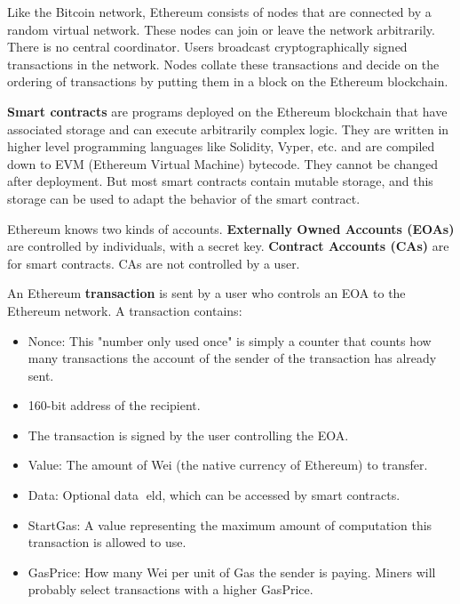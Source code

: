Like the Bitcoin network, Ethereum consists of nodes that are connected by a random virtual network. These nodes can join or leave the network arbitrarily. There is no central coordinator. Users broadcast cryptographically signed transactions in the network. Nodes collate these transactions and decide on the ordering of transactions by putting them in a block on the Ethereum blockchain. \medskip

\textbf{Smart contracts} are programs deployed on the Ethereum blockchain that have associated storage and can execute arbitrarily complex logic. They are written in higher level programming languages like Solidity, Vyper, etc. and are compiled down to EVM (Ethereum Virtual Machine) bytecode. They cannot be changed after deployment. But most smart contracts contain mutable storage, and this storage can be used to adapt the behavior of the smart contract. \medskip

Ethereum knows two kinds of accounts. \textbf{Externally Owned Accounts (EOAs)} are controlled by individuals, with a secret key. \textbf{Contract Accounts (CAs)} are for smart contracts. CAs are not controlled by a user. \medskip

An Ethereum \textbf{transaction} is sent by a user who controls an EOA to the Ethereum network. A transaction contains:
\begin{itemize}
	\item Nonce: This "number only used once" is simply a counter that counts how many transactions the account of the sender of the transaction has already sent.
	\item 160-bit address of the recipient.
	\item The transaction is signed by the user controlling the EOA.
	\item Value: The amount of Wei (the native currency of Ethereum) to transfer.
	\item Data: Optional data eld, which can be accessed by smart contracts.
	\item StartGas: A value representing the maximum amount of computation this transaction is allowed to use.
	\item GasPrice: How many Wei per unit of Gas the sender is paying. Miners will probably select transactions with a higher GasPrice.
\end{itemize}

